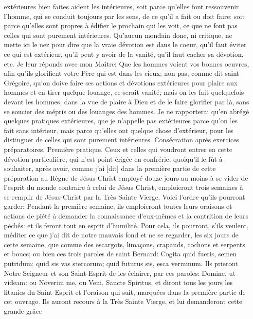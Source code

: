 extérieures bien faites aident les intérieures, soit parce qu'elles font ressouvenir l'homme, qui se conduit toujours
par les sens, de ce qu'il a fait ou doit faire; soit parce qu'elles sont propres à édifier le prochain qui les voit, ce que
ne font pas celles qui sont purement intérieures. Qu'aucun mondain donc, ni critique, ne mette ici le nez pour dire
que la vraie dévotion est dans le coeur, qu'il faut éviter ce qui est extérieur, qu'il peut y avoir de la vanité, qu'il faut
cacher sa dévotion, etc. Je leur réponds avec mon Maître: Que les hommes voient vos bonnes oeuvres, afin qu'ils
glorifient votre Père qui est dans les cieux; non pas, comme dit saint Grégoire, qu'on doive faire ses actions et
dévotions extérieures pour plaire aux hommes et en tirer quelque louange, ce serait vanité; mais on les fait
quelquefois devant les hommes, dans la vue de plaire à Dieu et de le faire glorifier par là, sans se soucier des
mépris ou des louanges des hommes. Je ne rapporterai qu'en abrégé quelques pratiques extérieures, que je
n'appelle pas extérieures parce qu'on les fait sans intérieur, mais parce qu'elles ont quelque chose d'extérieur,
pour les distinguer de celles qui sont purement intérieures.
Consécration après exercices préparatoires.
 Première pratique. Ceux et celles qui voudront entrer en cette dévotion particulière, qui n'est point érigée en
confrérie, quoiqu'il le fût à souhaiter, après avoir, comme j'ai [dit] dans la première partie de cette préparation au
Règne de Jésus-Christ employé douze jours au moins à se vider de l'esprit du monde contraire à celui de Jésus Christ, emploieront trois semaines à se remplir de Jésus-Christ par la Très Sainte Vierge. Voici l'ordre qu'ils
pourront garder:
 Pendant la première semaine, ils emploieront toutes leurs oraisons et actions de piété à demander la
connaissance d'eux-mêmes et la contrition de leurs péchés: et ils feront tout en esprit d'humilité. Pour cela, ils
pourront, s'ils veulent, méditer ce que j'ai dit de notre mauvais fond et ne se regarder, les six jours de cette
semaine, que comme des escargots, limaçons, crapauds, cochons et serpents et boucs; ou bien ces trois paroles
de saint Bernard: Cogita quid fueris, semen putridum; quid sis vas stercorum; quid futurus sis, esca verminum. Ils
prieront Notre Seigneur et son Saint-Esprit de les éclairer, par ces paroles: Domine, ut videam: ou Noverim me, ou
Veni, Sancte Spiritus, et diront tous les jours les litanies du Saint-Esprit et l'oraison qui suit, marquées dans la
première partie de cet ouvrage. Ils auront recours à la Très Sainte Vierge, et lui demanderont cette grande grâce
